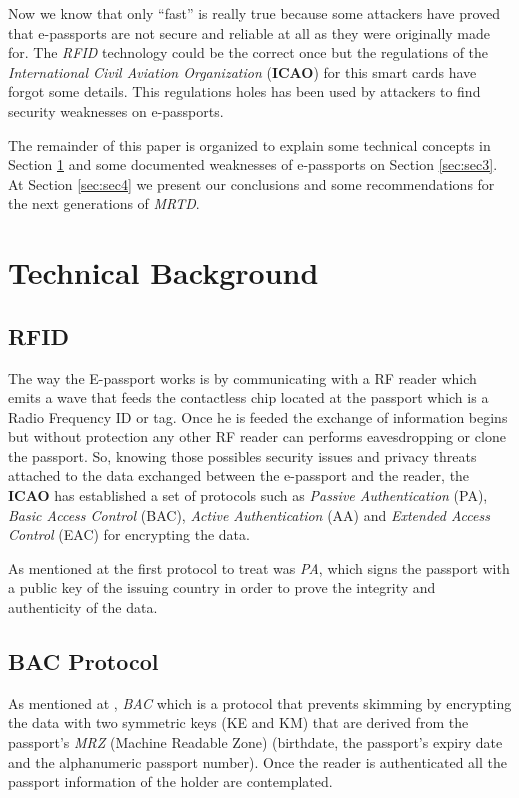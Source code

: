 \documentclass{acm_proc_article-sp}
\begin{document}
Now we know that only “fast” is really true because some attackers have proved that e-passports are not secure and reliable at all as they were originally made for. The \emph{RFID} technology could be the correct once but the regulations of the \emph{International Civil Aviation Organization }(\textbf{ICAO}) for this smart cards have forgot some details. This regulations holes has been used by attackers to find security weaknesses on e-passports.

The remainder of this paper is organized to explain some technical concepts in Section \ref{sec:sec2} and some documented weaknesses of e-passports on Section \ref{sec:sec3}. At Section \ref{sec:sec4} we present our conclusions and some recommendations for the next generations of \emph{MRTD}. 

\section{Technical Background}
\label{sec:sec2}

\subsection{RFID}
The way the E-passport works is by communicating with a RF reader which emits a wave that feeds 
the contactless chip located at the passport which is a Radio Frequency ID or tag. Once he is feeded the exchange of information begins but 
without protection any other RF reader can performs eavesdropping or clone the passport. So, knowing those possibles security issues and privacy threats attached to
the data exchanged between the e-passport and the reader, the \textbf{ICAO} 
has 
established a set of protocols such as \textit{Passive Authentication} (PA), \textit{Basic Access Control} (BAC), 
\textit{Active Authentication} (AA) and \textit{Extended Access Control} (EAC) for encrypting the data.

As mentioned at \cite{NM12} the first protocol to treat was \textit{PA}, which signs the passport with 
a public key of the issuing country in order to prove the integrity and authenticity of the data.

\subsection{BAC Protocol}
As mentioned at \cite{CLPS07}, \textit{BAC} which is a protocol that prevents skimming by encrypting 
the data with two symmetric keys (KE and KM) that are derived from the passport's  
\textit{MRZ} (Machine Readable Zone) (birthdate, the passport’s expiry date and the alphanumeric 
passport number). Once the reader is authenticated all the passport information of the holder are contemplated.
\end{document}
